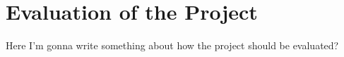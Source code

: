 \section{Evaluation of the Project}

Here I'm gonna write something about how the project should be evaluated? 
